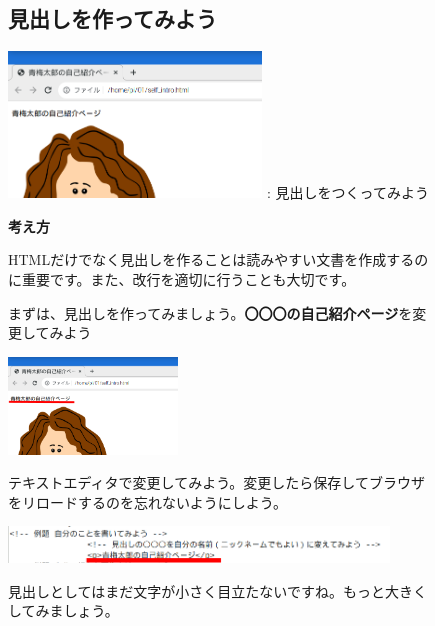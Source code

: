 \documentclass[a4paper,12pt]{jarticle}
\begin{document}
\vfill
\clearpage
\begin{figure}[ht]
  \subsection{\theExercise 見出しを作ってみよう}


  \centering
  \begin{minipage}{0.6\textwidth}
    {\upshape
      \includegraphics[width=0.6\textwidth]{textbook-img153.png}
      \newline
      : 見出しをつくってみよう}
  \end{minipage}


  \bigskip
  \flushleft

  \textbf{考え方}



  \begin{minipage}{\textwidth}
    \flushleft

    HTMLだけでなく見出しを作ることは読みやすい文書を作成するのに重要です。また、改行を適切に行うことも大切です。

    まずは、見出しを作ってみましょう。\textbf{〇〇〇の自己紹介ページ}を変更してみよう


    \bigskip

    \includegraphics[width=0.4\textwidth]{textbook-img154.png}


    \bigskip

    テキストエディタで変更してみよう。変更したら保存してブラウザをリロードするのを忘れないようにしよう。


    \bigskip

    \includegraphics[width=0.9\textwidth]{textbook-img155.png}


    \bigskip


    見出しとしてはまだ文字が小さく目立たないですね。もっと大きくしてみましょう。




    \bigskip
  \end{minipage}

\end{figure}
\end{document}
